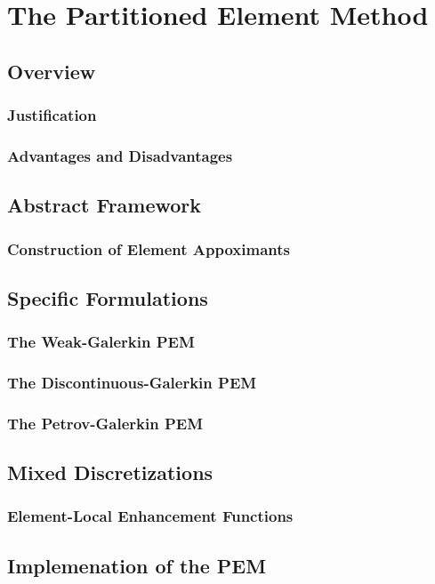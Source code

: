 \chapter{The Partitioned Element Method}
%
\section{Overview}
\subsection{Justification}
\subsection{Advantages and Disadvantages}

\section{Abstract Framework}
\subsection{Construction of Element Appoximants}

\section{Specific Formulations}
\subsection{The Weak-Galerkin PEM}
\subsection{The Discontinuous-Galerkin PEM}
\subsection{The Petrov-Galerkin PEM}

\section{Mixed Discretizations}
\subsection{Element-Local Enhancement Functions}

\section{Implemenation of the PEM}
